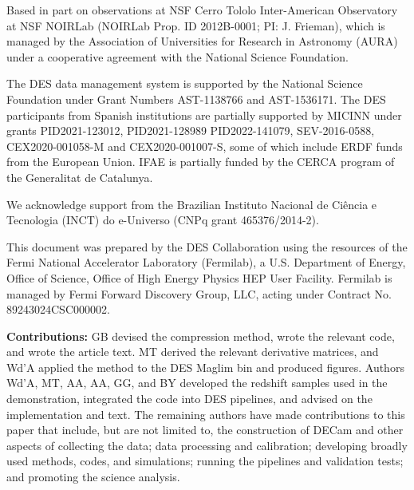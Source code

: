 \documentclass[onecolumn,resetfootnote]{aastex7}
\begin{document}
\begin{acknowledgments}
Based in part on observations at NSF Cerro Tololo Inter-American Observatory at NSF NOIRLab (NOIRLab Prop. ID 2012B-0001; PI: J. Frieman), which is managed by the Association of Universities for Research in Astronomy (AURA) under a cooperative agreement with the National Science Foundation.

The DES data management system is supported by the National Science Foundation under Grant Numbers AST-1138766 and AST-1536171.
The DES participants from Spanish institutions are partially supported by MICINN under grants PID2021-123012, PID2021-128989 PID2022-141079, SEV-2016-0588, CEX2020-001058-M and CEX2020-001007-S, some of which include ERDF funds from the European Union. IFAE is partially funded by the CERCA program of the Generalitat de Catalunya.

We  acknowledge support from the Brazilian Instituto Nacional de Ci\^encia
e Tecnologia (INCT) do e-Universo (CNPq grant 465376/2014-2).

This document was prepared by the DES Collaboration using the resources of the Fermi National Accelerator Laboratory (Fermilab), a U.S. Department of Energy, Office of Science, Office of High Energy Physics HEP User Facility. Fermilab is managed by Fermi Forward Discovery Group, LLC, acting under Contract No. 89243024CSC000002.
\end{acknowledgments}

\textbf{Contributions:}
GB devised the compression method, wrote the relevant code, and wrote the article text.  MT derived the relevant derivative matrices, and Wd'A applied the method to the DES Maglim bin and produced figures.  Authors Wd'A, MT, AA, AA, GG, and BY developed the redshift samples used in the demonstration, integrated the code into DES pipelines, and advised on the implementation and text.
The remaining authors have made contributions to this paper that include, but
are not limited to, the construction of DECam and other aspects of collecting the data; data
processing and calibration; developing broadly used methods, codes, and simulations; running
the pipelines and validation tests; and promoting the science analysis.
\end{document}
